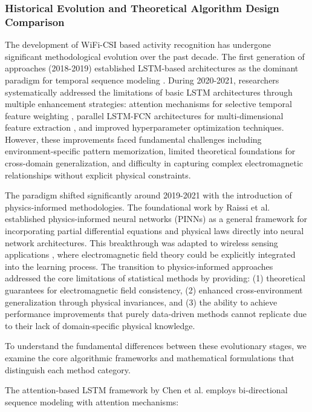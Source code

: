 \documentclass[journal]{IEEEtran}
\begin{document}
\subsubsection{Historical Evolution and Theoretical Algorithm Design Comparison}

The development of WiFi-CSI based activity recognition has undergone significant methodological evolution over the past decade. The first generation of approaches (2018-2019) established LSTM-based architectures as the dominant paradigm for temporal sequence modeling \cite{chen2018wifi}. During 2020-2021, researchers systematically addressed the limitations of basic LSTM architectures through multiple enhancement strategies: attention mechanisms for selective temporal feature weighting \cite{shang2021lstm}, parallel LSTM-FCN architectures for multi-dimensional feature extraction \cite{tang2021wifi}, and improved hyperparameter optimization techniques. However, these improvements faced fundamental challenges including environment-specific pattern memorization, limited theoretical foundations for cross-domain generalization, and difficulty in capturing complex electromagnetic relationships without explicit physical constraints.

The paradigm shifted significantly around 2019-2021 with the introduction of physics-informed methodologies. The foundational work by Raissi et al. \cite{raissi2019physics} established physics-informed neural networks (PINNs) as a general framework for incorporating partial differential equations and physical laws directly into neural network architectures. This breakthrough was adapted to wireless sensing applications \cite{olivares2021applications}, where electromagnetic field theory could be explicitly integrated into the learning process. The transition to physics-informed approaches addressed the core limitations of statistical methods by providing: (1) theoretical guarantees for electromagnetic field consistency, (2) enhanced cross-environment generalization through physical invariances, and (3) the ability to achieve performance improvements that purely data-driven methods cannot replicate due to their lack of domain-specific physical knowledge.

To understand the fundamental differences between these evolutionary stages, we examine the core algorithmic frameworks and mathematical formulations that distinguish each method category.

The attention-based LSTM framework by Chen et al. \cite{chen2018wifi} employs bi-directional sequence modeling with attention mechanisms:
\end{document}
